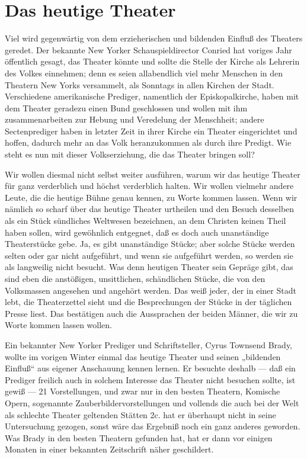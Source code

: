 \chapter{Das heutige Theater}

Viel wird gegenwärtig von dem erzieherischen und bildenden Einfluß des Theaters geredet. Der bekannte New Yorker Schauspieldirector Conried hat voriges Jahr öffentlich gesagt, das Theater könnte und sollte die Stelle der Kirche als Lehrerin des Volkes einnehmen; denn es seien allabendlich viel mehr Menschen in den Theatern New Yorks versammelt, als Sonntags in allen Kirchen der Stadt. Verschiedene amerikanische Prediger, namentlich der Episkopalkirche, haben mit dem Theater geradezu einen Bund geschlossen und wollen mit ihm zusammenarbeiten zur Hebung und Veredelung der Menschheit; andere Sectenprediger haben in letzter Zeit in ihrer Kirche ein Theater eingerichtet und hoffen, dadurch mehr an das Volk heranzukommen als durch ihre Predigt. Wie steht es nun mit dieser Volkserziehung, die das Theater bringen soll?

Wir wollen diesmal nicht selbst weiter ausführen, warum wir das heutige Theater für ganz verderblich und höchst verderblich halten. Wir wollen vielmehr andere Leute, die die heutige Bühne genau kennen, zu Worte kommen lassen. Wenn wir nämlich so scharf über das heutige Theater urtheilen und den Besuch desselben als ein Stück sündliches Weltwesen bezeichnen, an dem Christen keinen Theil haben sollen, wird gewöhnlich entgegnet, daß es doch auch unanständige Theaterstücke gebe. Ja, es gibt unanständige Stücke; aber solche Stücke werden selten oder gar nicht aufgeführt, und wenn sie aufgeführt werden, so werden sie als langweilig nicht besucht. Was denn heutigen Theater sein Gepräge gibt, das sind eben die anstößigen, unsittlichen, schändlichen Stücke, die von den Volksmassen angesehen und angehört werden. Das weiß jeder, der in einer Stadt lebt, die Theaterzettel sieht und die Besprechungen der Stücke in der täglichen Presse liest. Das bestätigen auch die Aussprachen der beiden Männer, die wir zu Worte kommen lassen wollen.

Ein bekannter New Yorker Prediger und Schriftsteller, Cyrus Townsend Brady, wollte im vorigen Winter einmal das heutige Theater und seinen „bildenden Einfluß“ aus eigener Anschauung kennen lernen. Er besuchte deshalb — daß ein Prediger freilich auch in solchem Interesse das Theater nicht besuchen sollte, ist gewiß — 21 Vorstellungen, und zwar nur in den besten Theatern, Komische Opern, sogenannte Zauberbildervorstellungen und vollends die auch bei der Welt als schlechte Theater geltenden Stätten 2c. hat er überhaupt nicht in seine Untersuchung gezogen, sonst wäre das Ergebniß noch ein ganz anderes geworden. Was Brady in den besten Theatern gefunden hat, hat er dann vor einigen Monaten in einer bekannten Zeitschrift näher geschildert.

